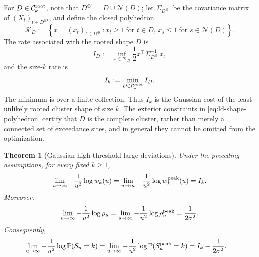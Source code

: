\documentclass[aap,preprint]{imsart}
\theoremstyle{plain}
\newtheorem{theorem}{Theorem}[section]
\theoremstyle{definition}
\def\P{{\mathbb P}}
\begin{document}
For $D\in\mathcal C_k^{\rm root}$, note that $D^{\oplus 1}=D\cup\mathcal N(D)$; let $\Sigma_{D^{\oplus 1}}$ be the covariance matrix of
$(X_t)_{t\in D^{\oplus 1}}$, and define the closed polyhedron
\begin{equation}\label{eq:ld-shape-polyhedron}
	\mathcal K_D
	:=
	\left\{
	x=(x_t)_{t\in D^{\oplus 1}}:
	x_t\geq1\ \text{for }t\in D,
	\,
	x_s\leq1\ \text{for }s\in\mathcal N(D)
	\right\}.
\end{equation}
The rate associated with the rooted shape $D$ is
\begin{equation*}
	I_D
	:=
	\inf_{x\in\mathcal K_D}
	\frac12x^\top\Sigma_{D^{\oplus 1}}^{-1}x,
\end{equation*}
and the size-$k$ rate is
\begin{equation*}
	I_k:=\min_{D\in\mathcal C_k^{\rm root}}I_D.
\end{equation*}
The minimum is over a finite collection.  Thus $I_k$ is the Gaussian cost
of the least unlikely rooted cluster shape of size $k$.  The exterior
constraints in \eqref{eq:ld-shape-polyhedron} certify that $D$ is the complete
cluster, rather than merely a connected set of exceedance sites, and in
general they cannot be omitted from the optimization.  

\begin{theorem}[Gaussian high-threshold large deviations]
	\label{thm:ld-high-threshold}
	Under the preceding assumptions, for every fixed $k\geq1$,
	\begin{equation}\label{eq:ld-weight-high-u}
		\lim_{u\to\infty}
		-\frac1{u^2}\log w_k(u)
		=
		\lim_{u\to\infty}
		-\frac1{u^2}\log w_k^{\rm peak}(u)
		=I_k.
	\end{equation}
	Moreover,
	\begin{equation}\label{eq:ld-normalizer-high-u}
		\lim_{u\to\infty}
		-\frac1{u^2}\log\rho_u
		=
		\lim_{u\to\infty}
		-\frac1{u^2}\log\rho_u^{\rm peak}
		=\frac1{2\sigma^2}.
	\end{equation}
	Consequently,
	\begin{equation}\label{eq:ld-pmf-high-u}
		\begin{split}
			\lim_{u\to\infty}
			-\frac1{u^2}\log\P(S_u=k)
			&=
			\lim_{u\to\infty}
			-\frac1{u^2}\log\P(S_u^{\rm peak}=k)=I_k-\frac1{2\sigma^2}.
		\end{split}
	\end{equation}
\end{theorem}
\end{document}
